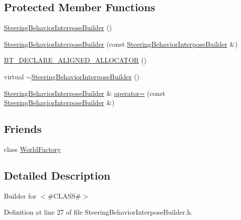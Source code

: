 \subsection*{Protected Member Functions}
\begin{DoxyCompactItemize}
\item 
\mbox{\hyperlink{classnjli_1_1_steering_behavior_interpose_builder_a3d97296b442d37648eb04b6dac78a7a7}{Steering\+Behavior\+Interpose\+Builder}} ()
\item 
\mbox{\hyperlink{classnjli_1_1_steering_behavior_interpose_builder_ad184ae7393bb51642efa7a07ca469d56}{Steering\+Behavior\+Interpose\+Builder}} (const \mbox{\hyperlink{classnjli_1_1_steering_behavior_interpose_builder}{Steering\+Behavior\+Interpose\+Builder}} \&)
\item 
\mbox{\hyperlink{classnjli_1_1_steering_behavior_interpose_builder_acb4d13b2b25b578a3ecf419c5de5ff15}{B\+T\+\_\+\+D\+E\+C\+L\+A\+R\+E\+\_\+\+A\+L\+I\+G\+N\+E\+D\+\_\+\+A\+L\+L\+O\+C\+A\+T\+OR}} ()
\item 
virtual \mbox{\hyperlink{classnjli_1_1_steering_behavior_interpose_builder_af8bf90bcf455ae7f7001e9dd8969ed1b}{$\sim$\+Steering\+Behavior\+Interpose\+Builder}} ()
\item 
\mbox{\hyperlink{classnjli_1_1_steering_behavior_interpose_builder}{Steering\+Behavior\+Interpose\+Builder}} \& \mbox{\hyperlink{classnjli_1_1_steering_behavior_interpose_builder_a252a00f1a3e50c2f49760b2288159630}{operator=}} (const \mbox{\hyperlink{classnjli_1_1_steering_behavior_interpose_builder}{Steering\+Behavior\+Interpose\+Builder}} \&)
\end{DoxyCompactItemize}
\subsection*{Friends}
\begin{DoxyCompactItemize}
\item 
class \mbox{\hyperlink{classnjli_1_1_steering_behavior_interpose_builder_acb96ebb09abe8f2a37a915a842babfac}{World\+Factory}}
\end{DoxyCompactItemize}


\subsection{Detailed Description}
Builder for $<$\#\+C\+L\+A\+SS\#$>$ 

Definition at line 27 of file Steering\+Behavior\+Interpose\+Builder.\+h.



